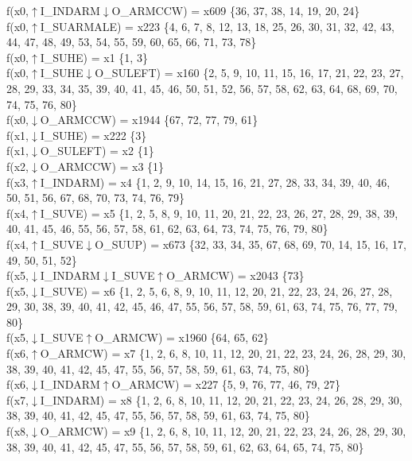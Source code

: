 f(x0,$\uparrow$I\_INDARM$\downarrow$O\_ARMCCW) = x609 \{36, 37, 38, 14, 19, 20, 24\} \\  
f(x0,$\uparrow$I\_SUARMALE) = x223 \{4, 6, 7, 8, 12, 13, 18, 25, 26, 30, 31, 32, 42, 43, 44, 47, 48, 49, 53, 54, 55, 59, 60, 65, 66, 71, 73, 78\} \\  
f(x0,$\uparrow$I\_SUHE) = x1 \{1, 3\} \\  
f(x0,$\uparrow$I\_SUHE$\downarrow$O\_SULEFT) = x160 \{2, 5, 9, 10, 11, 15, 16, 17, 21, 22, 23, 27, 28, 29, 33, 34, 35, 39, 40, 41, 45, 46, 50, 51, 52, 56, 57, 58, 62, 63, 64, 68, 69, 70, 74, 75, 76, 80\} \\  
f(x0,$\downarrow$O\_ARMCCW) = x1944 \{67, 72, 77, 79, 61\} \\  
f(x1,$\downarrow$I\_SUHE) = x222 \{3\} \\  
f(x1,$\downarrow$O\_SULEFT) = x2 \{1\} \\  
f(x2,$\downarrow$O\_ARMCCW) = x3 \{1\} \\  
f(x3,$\uparrow$I\_INDARM) = x4 \{1, 2, 9, 10, 14, 15, 16, 21, 27, 28, 33, 34, 39, 40, 46, 50, 51, 56, 67, 68, 70, 73, 74, 76, 79\} \\  
f(x4,$\uparrow$I\_SUVE) = x5 \{1, 2, 5, 8, 9, 10, 11, 20, 21, 22, 23, 26, 27, 28, 29, 38, 39, 40, 41, 45, 46, 55, 56, 57, 58, 61, 62, 63, 64, 73, 74, 75, 76, 79, 80\} \\  
f(x4,$\uparrow$I\_SUVE$\downarrow$O\_SUUP) = x673 \{32, 33, 34, 35, 67, 68, 69, 70, 14, 15, 16, 17, 49, 50, 51, 52\} \\  
f(x5,$\downarrow$I\_INDARM$\downarrow$I\_SUVE$\uparrow$O\_ARMCW) = x2043 \{73\} \\  
f(x5,$\downarrow$I\_SUVE) = x6 \{1, 2, 5, 6, 8, 9, 10, 11, 12, 20, 21, 22, 23, 24, 26, 27, 28, 29, 30, 38, 39, 40, 41, 42, 45, 46, 47, 55, 56, 57, 58, 59, 61, 63, 74, 75, 76, 77, 79, 80\} \\  
f(x5,$\downarrow$I\_SUVE$\uparrow$O\_ARMCW) = x1960 \{64, 65, 62\} \\  
f(x6,$\uparrow$O\_ARMCW) = x7 \{1, 2, 6, 8, 10, 11, 12, 20, 21, 22, 23, 24, 26, 28, 29, 30, 38, 39, 40, 41, 42, 45, 47, 55, 56, 57, 58, 59, 61, 63, 74, 75, 80\} \\  
f(x6,$\downarrow$I\_INDARM$\uparrow$O\_ARMCW) = x227 \{5, 9, 76, 77, 46, 79, 27\} \\  
f(x7,$\downarrow$I\_INDARM) = x8 \{1, 2, 6, 8, 10, 11, 12, 20, 21, 22, 23, 24, 26, 28, 29, 30, 38, 39, 40, 41, 42, 45, 47, 55, 56, 57, 58, 59, 61, 63, 74, 75, 80\} \\  
f(x8,$\downarrow$O\_ARMCW) = x9 \{1, 2, 6, 8, 10, 11, 12, 20, 21, 22, 23, 24, 26, 28, 29, 30, 38, 39, 40, 41, 42, 45, 47, 55, 56, 57, 58, 59, 61, 62, 63, 64, 65, 74, 75, 80\} \\  
